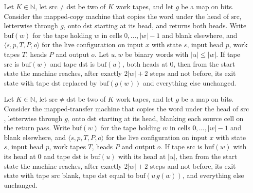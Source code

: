 \begin{theorem}
\label{Turing.NTimeDiag.qy_copy_over}
\leanok
{}
Let $K \in \mathbb{N}$, let $\mathrm{src} \ne \mathrm{dst}$ be two of $K$ work tapes, and let $g$
be a map on bits. Consider the mapped-copy machine that copies the word under the head of
$\mathrm{src}$, letterwise through $g$, onto $\mathrm{dst}$ starting at its head, and returns both
heads. Write $\mathrm{buf}(w)$ for the tape holding $w$ in cells $0, \dots, |w| - 1$ and blank
elsewhere, and $\langle s, p, T, P, o\rangle$ for the live configuration on input $x$ with state
$s$, input head $p$, work tapes $T$, heads $P$ and output $o$. Let $u, w$ be binary words with
$|u| \le |w|$. If tape $\mathrm{src}$ is $\mathrm{buf}(w)$ and tape $\mathrm{dst}$ is
$\mathrm{buf}(u)$, both heads at $0$, then from the start state the machine reaches, after exactly
$2|w| + 2$ steps and not before, its exit state with tape $\mathrm{dst}$ replaced by
$\mathrm{buf}(g(w))$ and everything else unchanged.
\end{theorem}

\begin{theorem}
\label{Turing.NTimeDiag.qy_transfer}
\leanok
{}
Let $K \in \mathbb{N}$, let $\mathrm{src} \ne \mathrm{dst}$ be two of $K$ work tapes, and let $g$
be a map on bits. Consider the mapped-transfer machine that copies the word under the head of
$\mathrm{src}$, letterwise through $g$, onto $\mathrm{dst}$ starting at its head, blanking each
source cell on the return pass. Write $\mathrm{buf}(w)$ for the tape holding $w$ in cells
$0, \dots, |w| - 1$ and blank elsewhere, and $\langle s, p, T, P, o\rangle$ for the live
configuration on input $x$ with state $s$, input head $p$, work tapes $T$, heads $P$ and output
$o$. If tape $\mathrm{src}$ is $\mathrm{buf}(w)$ with its head at $0$ and tape $\mathrm{dst}$ is
$\mathrm{buf}(u)$ with its head at $|u|$, then from the start state the machine reaches, after
exactly $2|w| + 2$ steps and not before, its exit state with tape $\mathrm{src}$ blank, tape
$\mathrm{dst}$ equal to $\mathrm{buf}(u \, g(w))$, and everything else unchanged.
\end{theorem}

